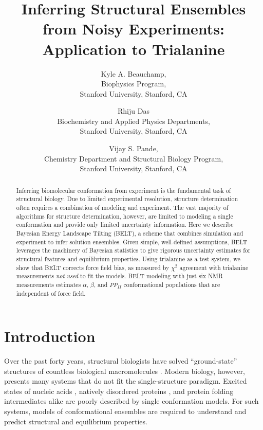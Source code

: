 \documentclass[11pt,titlepage]{article}
\author{Kyle A. Beauchamp, \\
Biophysics Program, \\
Stanford University, Stanford, CA
\and Rhiju Das \\
Biochemistry and Applied Physics Departments, \\
Stanford University, Stanford, CA
\and Vijay S. Pande, \\
Chemistry Department and Structural Biology Program, \\
Stanford University, Stanford, CA
}
\title{Inferring Structural Ensembles from Noisy Experiments: Application to Trialanine}
\begin{document}
\maketitle

\begin{abstract}

Inferring biomolecular conformation from experiment is the fundamental task of structural biology.  Due to limited experimental resolution, structure determination often requires a combination of modeling and experiment.  The vast majority of algorithms for structure determination, however, are limited to modeling a single conformation and provide only limited uncertainty information.  Here we describe Bayesian Energy Landscape Tilting (BELT), a scheme that combines simulation and experiment to infer solution ensembles.  Given simple, well-defined assumptions, BELT leverages the machinery of Bayesian statistics to give rigorous uncertainty estimates for structural features and equilibrium properties.  Using trialanine as a test system, we show that BELT corrects force field bias, as measured by $\chi^2$ agreement with trialanine measurements \emph{not used} to fit the models.  BELT modeling with just six NMR measurements estimates $\alpha$, $\beta$, and $PP_{II}$ conformational populations that are 
independent of force field.  

\end{abstract}

\section*{Introduction}

Over the past forty years, structural biologists have solved ``ground-state'' structures of countless biological macromolecules \citep{Berman2000}. Modern biology, however, presents many systems that do not fit the single-structure paradigm.  Excited states of nucleic acids \citep{dethoff2012}, natively disordered proteins \citep{fink2005}, and protein folding intermediates \citep{korzhnev2004} alike are poorly described by single conformation models.  For such systems, models of conformational ensembles are required to understand and predict structural and equilibrium properties.  
\end{document}
